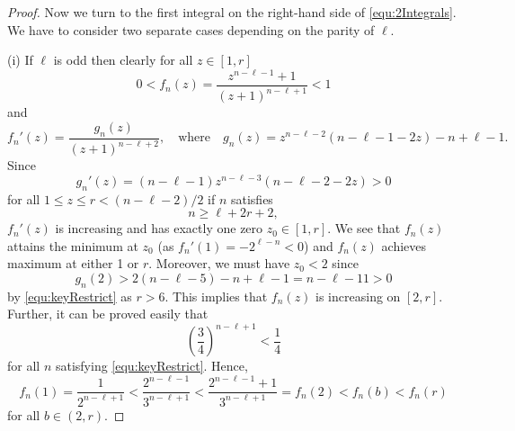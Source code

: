 \documentclass[10pt,a4paper]{amsart}
\begin{document}
\begin{proof}
Now we turn to the first integral on the right-hand side of \eqref{equ:2Integrals}.
We have to consider two separate cases depending on the parity of $\ell$.

\medskip\noindent
(i) If $\ell$ is odd then clearly for all $z\in [1, r]$
\begin{equation*}
0< f_n(z)=\frac{z^{n-\ell-1}+1}{(z+1)^{n-\ell+1}}<1
\end{equation*}
and
\begin{equation*}
f_n'(z)=\frac{g_n(z)}{(z+1)^{n-\ell+2}}, \quad\text{where}\quad g_n(z)=z^{n-\ell-2}(n-\ell-1-2z)-n+\ell-1.
\end{equation*}
Since
\begin{equation*}
g_n'(z)=(n-\ell-1)z^{n-\ell-3}(n-\ell-2-2z)>0
\end{equation*}
for all $1\le z\le r< (n-\ell-2)/2$ if $n$ satisfies
\begin{equation}\label{equ:keyRestrict}
n\ge \ell+2r+2,
\end{equation}
$f_n'(z)$ is increasing and has exactly one zero $z_0\in [1,r]$.
We see that $f_n(z)$ attains the minimum at $z_0$ (as $f_n'(1)=-2^{\ell-n}<0$) and $f_n(z)$ achieves maximum at either 1 or $r$.
Moreover, we must have $z_0<2$ since
\begin{equation*}
g_n(2)> 2(n-\ell-5)-n+\ell-1=n-\ell-11>0
\end{equation*}
by \eqref{equ:keyRestrict} as $r>6$. This implies that $f_n(z)$ is increasing on $[2,r]$.
Further, it can be proved easily that
\begin{equation*}
\left(\frac{3}{4}\right)^{n-\ell+1}< \frac14
\end{equation*}
for all $n$ satisfying \eqref{equ:keyRestrict}. Hence,
\begin{equation}\label{equ:fbLargest}
f_n(1)=\frac{1}{2^{n-\ell+1}}<\frac{2^{n-\ell-1}}{3^{n-\ell+1}}<\frac{2^{n-\ell-1}+1}{3^{n-\ell+1}}=f_n(2)<f_n(b)<f_n(r)
\end{equation}
for all $b\in (2,r)$.


\end{proof}
\end{document}
